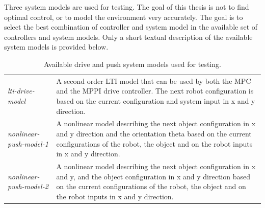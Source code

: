 Three system models are used for testing. The goal of this thesis is not to find optimal control, or to model the environment very accurately. The goal is to select the best combination of controller and system model in the available set of controllers and system models. Only a short textual description of the available system models is provided below.\bs
 

\noindent
\begin{table}[H]
\centering
\begin{tabular}%
  {>{\raggedright\arraybackslash}p{}%
   >{\raggedright\arraybackslash}p{}}
\textit{lti-drive-model} & A second order \ac{LTI} model that can be used by both the \ac{MPC} and the \ac{MPPI} drive controller. The next robot configuration is based on the current configuration and system input in \gls{x} and \gls{y} direction. \\
\textit{nonlinear-push-model-1} & A nonlinear model describing the next object configuration in \gls{x} and \gls{y} direction and the orientation \gls{theta} based on the current configurations of the robot, the object and on the robot inputs in \gls{x} and \gls{y} direction.\\
\textit{nonlinear-push-model-2} & A nonlinear model describing the next object configuration in \gls{x} and \gls{y}, and the object configuration in \gls{x} and \gls{y} direction based on the current configurations of the robot, the object and on the robot inputs in \gls{x} and \gls{y} direction.\\
\end{tabular}
\caption{Available drive and push system models used for testing.}\label{table:available_system_models}
\end{table}




